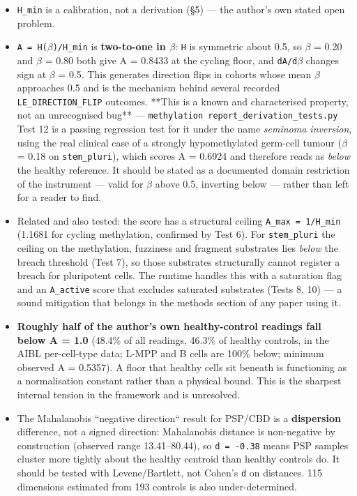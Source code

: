 \documentclass[12pt,a4paper]{article}
\begin{document}
\begin{itemize}\setlength\itemsep{2pt}
  \item \texttt{H\_min} is a calibration, not a derivation (\S5) --- the author's own stated open problem.
  \item \texttt{A = H($\beta$)/H\_min} is \textbf{two-to-one in $\beta$}: \texttt{H} is symmetric about 0.5, so $\beta$ = 0.20 and $\beta$ = 0.80 both give A = 0.8433 at the cycling floor, and \texttt{dA/d$\beta$} changes sign at $\beta$ = 0.5. This generates direction flips in cohorts whose mean $\beta$ approaches 0.5 and is the mechanism behind several recorded \texttt{LE\_DIRECTION\_FLIP} outcomes. **This is a known and characterised property, not an unrecognised bug** --- \texttt{methylation report\_derivation\_tests.py} Test 12 is a passing regression test for it under the name \textit{seminoma inversion}, using the real clinical case of a strongly hypomethylated germ-cell tumour ($\beta$ = 0.18 on \texttt{stem\_pluri}), which scores A = 0.6924 and therefore reads as \textit{below} the healthy reference. It should be stated as a documented domain restriction of the instrument --- valid for $\beta$ above 0.5, inverting below --- rather than left for a reader to find.
  \item Related and also tested: the score has a structural ceiling \texttt{A\_max = 1/H\_min} (1.1681 for cycling methylation, confirmed by Test 6). For \texttt{stem\_pluri} the ceiling on the methylation, fuzziness and fragment substrates lies \textit{below} the breach threshold (Test 7), so those substrates structurally cannot register a breach for pluripotent cells. The runtime handles this with a saturation flag and an \texttt{A\_active} score that excludes saturated substrates (Tests 8, 10) --- a sound mitigation that belongs in the methods section of any paper using it.
  \item \textbf{Roughly half of the author's own healthy-control readings fall below A = 1.0} (48.4\% of all readings, 46.3\% of healthy controls, in the AIBL per-cell-type data; L-MPP and B cells are 100\% below; minimum observed A = 0.5357). A floor that healthy cells sit beneath is functioning as a normalisation constant rather than a physical bound. This is the sharpest internal tension in the framework and is unresolved.
  \item The Mahalanobis ``negative direction`` result for PSP/CBD is a \textbf{dispersion} difference, not a signed direction: Mahalanobis distance is non-negative by construction (observed range 13.41--80.44), so \texttt{d = -0.38} means PSP samples cluster more tightly about the healthy centroid than healthy controls do. It should be tested with Levene/Bartlett, not Cohen's \texttt{d} on distances. 115 dimensions estimated from 193 controls is also under-determined.

\end{itemize}
\end{document}
